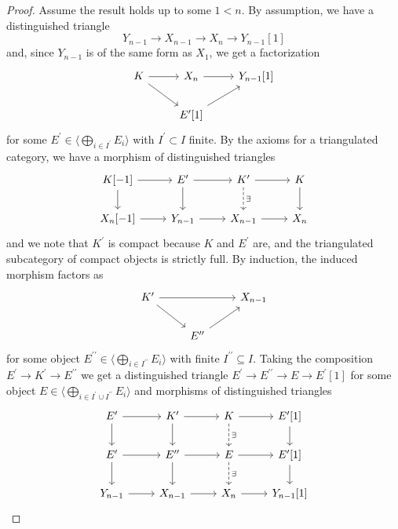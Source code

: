 \documentclass[dissertation.tex]{subfiles}
\begin{document}
\begin{lem}
\begin{proof}
    Assume the result holds up to some $1 < n$.
    By assumption, we have a distinguished triangle
    $$Y_{n-1} \rightarrow X_{n-1} \rightarrow X_{n} \rightarrow Y_{n-1}[1]$$
    and, since $Y_{n-1}$ is of the same form as $X_1$, we get a factorization
    $$\begin{tikzcd}
      K \arrow{rd}\arrow{r} & X_n \arrow{r} & Y_{n-1}[1]\\
      & E^\prime[1]\arrow{ur}
    \end{tikzcd}$$
    for some $E^\prime \in \langle \bigoplus_{i \in I^\prime}E_i \rangle$ with $I^\prime \subset I$ finite.
    By the axioms for a triangulated category, we have a morphism of distinguished triangles
    $$\begin{tikzcd}
      K[-1] \arrow{d}\arrow{r} & E^\prime \arrow{r}\arrow{d} & K^\prime \arrow{r}\arrow[dashed]{d}{\exists} & K\arrow{d}\\
      X_n[-1] \arrow{r} & Y_{n-1} \arrow{r} & X_{n-1} \arrow{r} & X_n
    \end{tikzcd}$$
    and we note that $K^\prime$ is compact because $K$ and $E^\prime$ are, and the triangulated subcategory of compact objects is strictly full.
    By induction, the induced morphism factors as
    $$\begin{tikzcd}
      K^\prime \arrow{rr}\arrow{rd} & & X_{n-1}\\
      & E^{\prime\prime}\arrow{ur}
    \end{tikzcd}$$
    for some object $E^{\prime\prime} \in \langle \bigoplus_{i \in I^{\prime\prime}} E_i \rangle$ with finite $I^{\prime\prime} \subseteq I$.
    Taking the composition $E^\prime \rightarrow K^\prime \rightarrow E^{\prime\prime}$ we get a distinguished triangle $E^\prime \rightarrow E^{\prime\prime} \rightarrow E \rightarrow E^\prime[1]$ for some object $E \in \langle \bigoplus_{i \in I^\prime \cup I^{\prime\prime}}E_i\rangle$ and morphisms of distinguished triangles
    $$\begin{tikzcd}
      E^\prime \arrow{r}\arrow{d} & K^\prime \arrow{r}\arrow{d} & K \arrow{r}\arrow[dashed]{d}{\exists} & E^\prime[1]\arrow{d}\\
      E^\prime \arrow{r}\arrow{d} & E^{\prime\prime} \arrow{r}\arrow{d} & E \arrow{r}\arrow[dashed]{d}{\exists} & E^\prime[1]\arrow{d}\\
      Y_{n-1} \arrow{r} & X_{n-1} \arrow{r} & X_n \arrow{r} & Y_{n-1}[1]
    \end{tikzcd}$$
    

\end{proof}
\end{lem}
\end{document}
